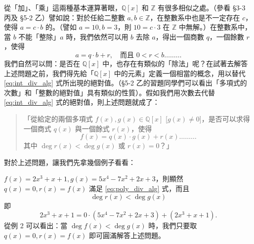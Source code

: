 從「加」、「乘」這兩種基本運算著眼，$\mathbb{Q}[x]$ 和 $\mathbb{Z}$ 有很多相似之處。（參看 \S 3-3 丙及 \S 5-2 乙）譬如說：對於任給二整數 $a, b \in \mathbb{Z}$，在整數系中也是不一定存在 $c$，使得 $a=c \cdot b$ 的。（譬如 $a=10, b=3$，則 $10=c \cdot 3$ 在 $\mathbb{Z}$ 中無解。）在整數系中，當 $b$ 不能「整除」$a$ 時，我們依然可以用 $b$ 去除 $a$，得出一個商數 $q$，一個餘數 $r$，使得
\begin{equation}\label{eq:int_div_alg}
  a = q \cdot b + r, \quad \text{而且 } 0 < r < b \dots\dots\dots
\end{equation}
我們自然可以問：是否在 $\mathbb{Q}[x]$ 中，也存在有類似的「除法」呢？在試著去解答上述問題之前，我們得先給「$\mathbb{Q}[x]$ 中的元素」定義一個相當的概念，用以替代 \eqref{eq:int_div_alg} 式所出現的絕對值。（\S 5-2 乙的習題同學們可以看出「多項式的次數」和「整數的絕對值」具有類似的性質）。假如我們用次數去代替 \eqref{eq:int_div_alg} 式的絕對值，則上述問題就成了：
\begin{quote}
「從給定的兩個多項式 $f(x), g(x) \in \mathbb{Q}[x]$ [$g(x) \neq 0$]，是否可以求得一個商式 $q(x)$ 與一個餘式 $r(x)$，使得
\begin{equation}\label{eq:poly_div_alg}
  f(x) = q(x) \cdot g(x) + r(x) \dots\dots\dots
\end{equation}
其中 $\deg r(x) < \deg g(x)$ 或 $r(x)=0$？」
\end{quote}

對於上述問題，讓我們先拿幾個例子看看：

\begin{example}\label{ex:5-4-2}
$f(x)=2x^3+x+1, g(x)=5x^4-7x^2+2x+3$，則顯然 $q(x)=0, r(x)=f(x)$ 滿足 \eqref{eq:poly_div_alg} 式，而且
\begin{equation*}
  \deg r(x) < \deg g(x)
\end{equation*}
即
\begin{equation*}
  2x^3+x+1 = 0 \cdot (5x^4-7x^2+2x+3) + (2x^3+x+1).
\end{equation*}
從例 2 可以看出：當 $\deg f(x) < \deg g(x)$ 時，我們只要取 $q(x)=0, r(x)=f(x)$ 即可圓滿解答上述問題。
\end{example}


